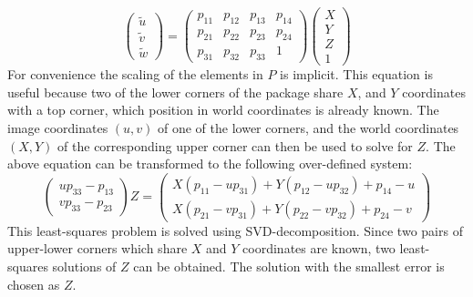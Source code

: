 $$\begin{pmatrix} \tilde{u} \\ \tilde{v} \\ \tilde{w} \end{pmatrix} =
\begin{pmatrix} p_{11} & p_{12} & p_{13} & p_{14} \\
 				p_{21} & p_{22} & p_{23} & p_{24} \\
				p_{31} & p_{32} & p_{33} & 1 \end{pmatrix}
\begin{pmatrix}X \\Y \\Z \\1\end{pmatrix}$$
For convenience the scaling of the elements in $P$ is implicit.
This equation is useful because two of the lower corners of the package share $X$, and $Y$ coordinates with a top corner, which position in world coordinates is already known.
The image coordinates $(u,v)$ of one of the lower corners, and the world coordinates $(X,Y)$ of the corresponding upper corner can then be used to solve for $Z$. 
The above equation can be transformed to the following over-defined system:
$$
\begin{pmatrix} up_{33}-p_{13} \\ vp_{33}-p_{23} \end{pmatrix} Z = 
\begin{pmatrix}
X(p_{11}-up_{31}) + Y(p_{12}-up_{32})+p_{14}-u \\
X(p_{21}-vp_{31}) + Y(p_{22}-vp_{32})+p_{24}-v
\end{pmatrix}
$$
This least-squares problem is solved using SVD-decomposition. %
Since two pairs of upper-lower corners which share $X$ and $Y$ coordinates are known, two least-squares solutions of $Z$ can be obtained.
The solution with the smallest error is chosen as $Z$.




















